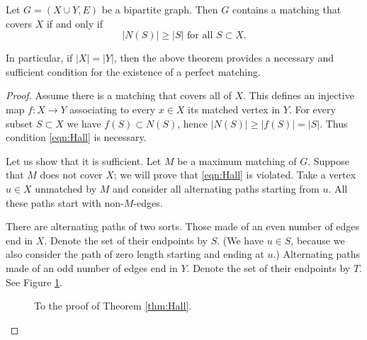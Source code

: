 \begin{page}
\setcounter{section}{4}
\setcounter{subsection}{4}
\setcounter{dfn}{7}
\label{portion:394}

\begin{thm}[Hall]
\label{thm:Hall}
Let $G = (X \cup Y, E)$ be a bipartite graph.
Then $G$ contains a matching that covers $X$ if and only if
\begin{equation}
\label{eqn:Hall}
|N(S)| \ge |S| \text{ for all } S \subset X.
\end{equation}
\end{thm}

\end{page}

\begin{page}
\setcounter{section}{4}
\setcounter{subsection}{4}
\setcounter{dfn}{7}
\label{portion:395}

In particular, if $|X| = |Y|$, then the above theorem provides a necessary and sufficient condition for the existence of a perfect matching.
\begin{proof}
Assume there is a matching that covers all of $X$.
This defines an injective map $f \colon X \to Y$ associating to every $x \in X$ its matched vertex in $Y$.
For every subset $S \subset X$ we have $f(S) \subset N(S)$, hence $|N(S)| \ge |f(S)| = |S|$.
Thus condition \eqref{eqn:Hall} is necessary.

Let us show that it is sufficient.
Let $M$ be a maximum matching of $G$.
Suppose that $M$ does not cover $X$; we will prove that \eqref{eqn:Hall} is violated.
Take a vertex $u \in X$ unmatched by $M$ and consider all alternating paths starting from $u$.
All these paths start with non-$M$-edges.

There are alternating paths of two sorts.
Those made of an even number of edges end in $X$.
Denote the set of their endpoints by $S$.
(We have $u \in S$, because we also consider the path of zero length starting and ending at $u$.)
Alternating paths made of an odd number of edges end in $Y$.
Denote the set of their endpoints by $T$.
See Figure \ref{fig:HallProof}.

\begin{figure}[ht]
\begin{center}

\end{center}
\caption{To the proof of Theorem \ref{thm:Hall}.}
\label{fig:HallProof}
\end{figure}


\end{proof}
\end{page}

